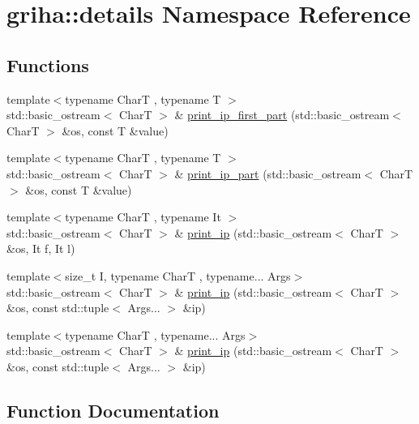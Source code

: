 \hypertarget{namespacegriha_1_1details}{}\section{griha\+:\+:details Namespace Reference}
\label{namespacegriha_1_1details}
\subsection*{Functions}
\begin{DoxyCompactItemize}
\item 
{\footnotesize template$<$typename CharT , typename T $>$ }\\std\+::basic\+\_\+ostream$<$ CharT $>$ \& \hyperlink{namespacegriha_1_1details_a966af4f61766b1644d2221093035aa94}{print\+\_\+ip\+\_\+first\+\_\+part} (std\+::basic\+\_\+ostream$<$ CharT $>$ \&os, const T \&value)
\item 
{\footnotesize template$<$typename CharT , typename T $>$ }\\std\+::basic\+\_\+ostream$<$ CharT $>$ \& \hyperlink{namespacegriha_1_1details_a598409443fccf1540c197b012f836d5f}{print\+\_\+ip\+\_\+part} (std\+::basic\+\_\+ostream$<$ CharT $>$ \&os, const T \&value)
\item 
{\footnotesize template$<$typename CharT , typename It $>$ }\\std\+::basic\+\_\+ostream$<$ CharT $>$ \& \hyperlink{namespacegriha_1_1details_aab9e1f097918e95aff6ba4c040865632}{print\+\_\+ip} (std\+::basic\+\_\+ostream$<$ CharT $>$ \&os, It f, It l)
\item 
{\footnotesize template$<$size\+\_\+t I, typename CharT , typename... Args$>$ }\\std\+::basic\+\_\+ostream$<$ CharT $>$ \& \hyperlink{namespacegriha_1_1details_aa298e5a3200d5b4b8f1833ba2736dabc}{print\+\_\+ip} (std\+::basic\+\_\+ostream$<$ CharT $>$ \&os, const std\+::tuple$<$ Args... $>$ \&ip)
\item 
{\footnotesize template$<$typename CharT , typename... Args$>$ }\\std\+::basic\+\_\+ostream$<$ CharT $>$ \& \hyperlink{namespacegriha_1_1details_ae436fa4f3b9609914597737b2a61abc9}{print\+\_\+ip} (std\+::basic\+\_\+ostream$<$ CharT $>$ \&os, const std\+::tuple$<$ Args... $>$ \&ip)
\end{DoxyCompactItemize}


\subsection{Function Documentation}
